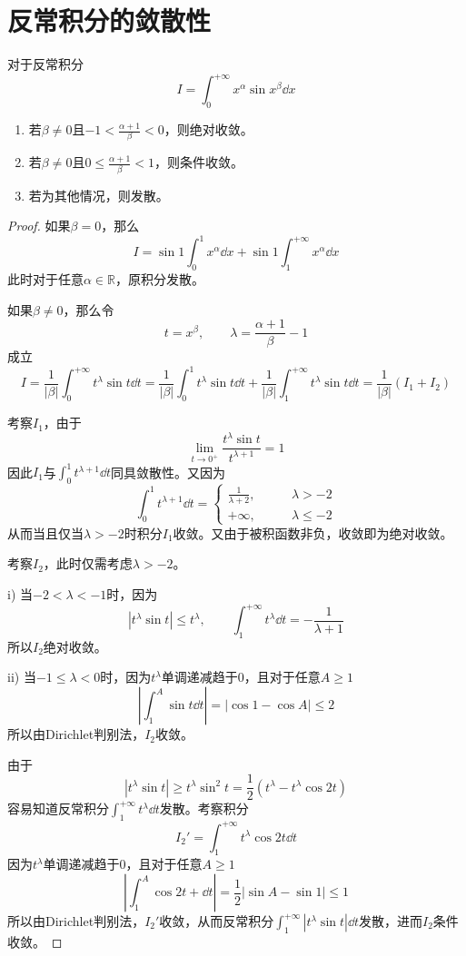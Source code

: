 \documentclass[lang = cn, scheme = chinese, thmcnt = section]{elegantbook}
\newcommand{\R}{\mathbb{R}}            %
\begin{document}
\section{反常积分的敛散性}

\begin{theorem}
	对于反常积分
	$$
	I=\int_{0}^{+\infty}x^\alpha\sin x^\beta\dd x
	$$
	\begin{enumerate}
		\item 若$\beta\ne0$且$-1<\frac{\alpha+1}{\beta}<0$，则绝对收敛。
		\item 若$\beta\ne0$且$0\le \frac{\alpha+1}{\beta}<1$，则条件收敛。
		\item 若为其他情况，则发散。
	\end{enumerate}
\end{theorem}

\begin{proof}
	如果$\beta=0$，那么
	$$
	I=\sin 1\int_{0}^{1}x^\alpha\dd x+\sin 1\int_{1}^{+\infty}x^\alpha\dd x
	$$
	此时对于任意$\alpha\in\R$，原积分发散。
	
	如果$\beta\ne 0$，那么令
	$$
	t=x^\beta,\qquad 
	\lambda=\frac{\alpha+1}{\beta}-1
	$$
	成立
	$$
	I = \frac{1}{|\beta|}\int_{0}^{+\infty}t^{\lambda}\sin t\dd t
	= \frac{1}{|\beta|}\int_{0}^{1}t^{\lambda}\sin t\dd t+\frac{1}{|\beta|}\int_{1}^{+\infty}t^{\lambda}\sin t\dd t
	= \frac{1}{|\beta|}(I_1+I_2)
	$$
	
	考察$I_1$，由于
	$$
	\lim_{t\to 0^+}\frac{t^\lambda \sin t}{t^{\lambda+1}}=1
	$$
	因此$I_1$与$\displaystyle \int_{0}^{1}t^{\lambda+1}\dd t$同具敛散性。又因为
	$$
	\int_{0}^{1}t^{\lambda+1}\dd t=\begin{cases}
		\frac{1}{\lambda+2},\qquad & \lambda >-2\\
		+\infty,\qquad & \lambda \le -2
	\end{cases}
	$$
	从而当且仅当$\lambda >-2$时积分$I_1$收敛。又由于被积函数非负，收敛即为绝对收敛。
	
	考察$I_2$，此时仅需考虑$\lambda >-2$。
	
	i) 当$-2<\lambda <-1$时，因为
	$$
	|t^{\lambda}\sin t|\le t^{\lambda},\qquad 
	\int_{1}^{+\infty}t^{\lambda}\dd t=-\frac{1}{\lambda+1}
	$$
	所以$I_2$绝对收敛。
	
	ii) 当$-1\le \lambda <0$时，因为$t^\lambda$单调递减趋于$0$，且对于任意$A\ge 1$
	$$
	\left| \int_{1}^{A}\sin t\dd t \right|=|\cos 1 - \cos A|\le 2
	$$
	所以由Dirichlet判别法，$I_2$收敛。
	
	由于
	$$
	|t^{\lambda}\sin t|
	\ge t^{\lambda}\sin^2 t
	= \frac{1}{2}(t^{\lambda}-t^{\lambda}\cos 2t)
	$$
	容易知道反常积分$\displaystyle \int_{1}^{+\infty}t^{\lambda}\dd t$发散。考察积分
	$$
	I_2'=\int_{1}^{+\infty}t^{\lambda}\cos 2t\dd t
	$$
	因为$t^\lambda$单调递减趋于$0$，且对于任意$A\ge 1$
	$$
	\left| \int_{1}^{A}\cos 2t+\dd t \right|=\frac{1}{2}|\sin A - \sin 1|\le 1
	$$
	所以由Dirichlet判别法，$I_2'$收敛，从而反常积分$\displaystyle \int_{1}^{+\infty}|t^{\lambda}\sin t|\dd t$发散，进而$I_2$条件收敛。
	

\end{proof}
\end{document}
